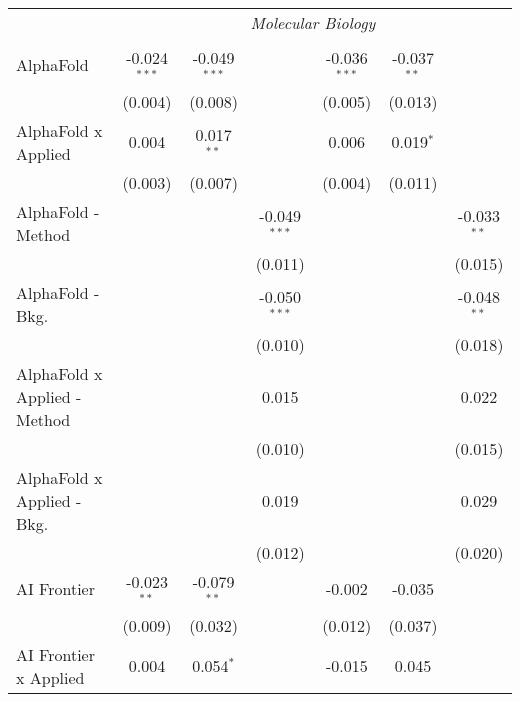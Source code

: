 \begin{tabular}{lcccccc}
 & \multicolumn{6}{c}{\textit{Molecular Biology}} \\ \\
   AlphaFold                      & -0.024$^{***}$ & -0.049$^{***}$ &                & -0.036$^{***}$ & -0.037$^{**}$ &   \\   
                                  & (0.004)        & (0.008)        &                & (0.005)        & (0.013)       &   \\   
   AlphaFold x Applied            & 0.004          & 0.017$^{**}$   &                & 0.006          & 0.019$^{*}$   &   \\   
                                  & (0.003)        & (0.007)        &                & (0.004)        & (0.011)       &   \\   
   AlphaFold - Method             &                &                & -0.049$^{***}$ &                &               & -0.033$^{**}$\\   
                                  &                &                & (0.011)        &                &               & (0.015)\\   
   AlphaFold - Bkg.               &                &                & -0.050$^{***}$ &                &               & -0.048$^{**}$\\   
                                  &                &                & (0.010)        &                &               & (0.018)\\   
   AlphaFold x Applied - Method   &                &                & 0.015          &                &               & 0.022\\   
                                  &                &                & (0.010)        &                &               & (0.015)\\   
   AlphaFold x Applied - Bkg.     &                &                & 0.019          &                &               & 0.029\\   
                                  &                &                & (0.012)        &                &               & (0.020)\\   
   AI Frontier                    & -0.023$^{**}$  & -0.079$^{**}$  &                & -0.002         & -0.035        &   \\   
                                  & (0.009)        & (0.032)        &                & (0.012)        & (0.037)       &   \\   
   AI Frontier x Applied          & 0.004          & 0.054$^{*}$    &                & -0.015         & 0.045         &   \\   

\end{tabular}
